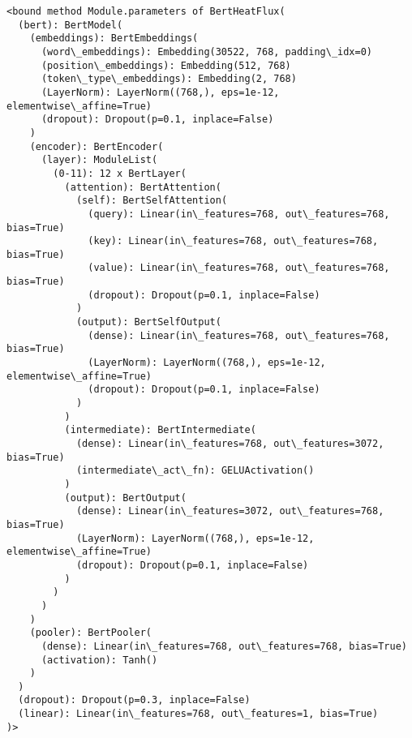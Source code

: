 \documentclass[11pt]{article}
\makeatletter
\newcommand{\boxspacing}{\kern\kvtcb@left@rule\kern\kvtcb@boxsep}
\newcommand{\prompt}[4]{
        {\ttfamily\llap{{\color{#2}[#3]:\hspace{3pt}#4}}\vspace{-\baselineskip}}
    }
\makeatother
\begin{document}
            \begin{tcolorbox}[breakable, size=fbox, boxrule=.5pt, pad at break*=1mm, opacityfill=0]
\prompt{Out}{outcolor}{47}{\boxspacing}
\begin{Verbatim}[commandchars=\\\{\}]
<bound method Module.parameters of BertHeatFlux(
  (bert): BertModel(
    (embeddings): BertEmbeddings(
      (word\_embeddings): Embedding(30522, 768, padding\_idx=0)
      (position\_embeddings): Embedding(512, 768)
      (token\_type\_embeddings): Embedding(2, 768)
      (LayerNorm): LayerNorm((768,), eps=1e-12, elementwise\_affine=True)
      (dropout): Dropout(p=0.1, inplace=False)
    )
    (encoder): BertEncoder(
      (layer): ModuleList(
        (0-11): 12 x BertLayer(
          (attention): BertAttention(
            (self): BertSelfAttention(
              (query): Linear(in\_features=768, out\_features=768, bias=True)
              (key): Linear(in\_features=768, out\_features=768, bias=True)
              (value): Linear(in\_features=768, out\_features=768, bias=True)
              (dropout): Dropout(p=0.1, inplace=False)
            )
            (output): BertSelfOutput(
              (dense): Linear(in\_features=768, out\_features=768, bias=True)
              (LayerNorm): LayerNorm((768,), eps=1e-12, elementwise\_affine=True)
              (dropout): Dropout(p=0.1, inplace=False)
            )
          )
          (intermediate): BertIntermediate(
            (dense): Linear(in\_features=768, out\_features=3072, bias=True)
            (intermediate\_act\_fn): GELUActivation()
          )
          (output): BertOutput(
            (dense): Linear(in\_features=3072, out\_features=768, bias=True)
            (LayerNorm): LayerNorm((768,), eps=1e-12, elementwise\_affine=True)
            (dropout): Dropout(p=0.1, inplace=False)
          )
        )
      )
    )
    (pooler): BertPooler(
      (dense): Linear(in\_features=768, out\_features=768, bias=True)
      (activation): Tanh()
    )
  )
  (dropout): Dropout(p=0.3, inplace=False)
  (linear): Linear(in\_features=768, out\_features=1, bias=True)
)>
\end{Verbatim}
\end{tcolorbox}
        
    \begin{tcolorbox}[breakable, size=fbox, boxrule=1pt, pad at break*=1mm,colback=cellbackground, colframe=cellborder]
\prompt{In}{incolor}{ }{\boxspacing}
\begin{Verbatim}[commandchars=\\\{\}]

\end{Verbatim}
\end{tcolorbox}


    
    
    
\end{document}
